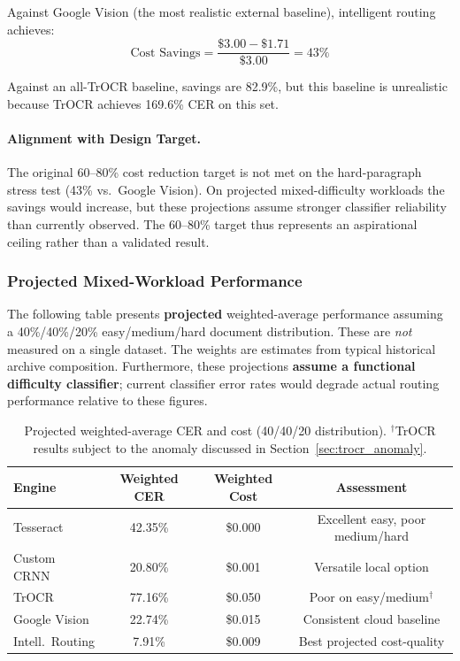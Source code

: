 \documentclass[12pt,a4paper]{article}
\begin{document}
Against Google Vision (the most realistic external baseline),
intelligent routing achieves:
\[
  \text{Cost Savings} =
  \frac{\$3.00 - \$1.71}{\$3.00} = 43\%
\]

Against an all-TrOCR baseline, savings are 82.9\%, but this baseline
is unrealistic because TrOCR achieves 169.6\% CER on this set.

\paragraph{Alignment with Design Target.}
The original 60--80\% cost reduction target is not met on the
hard-paragraph stress test (43\% vs.\ Google Vision). On projected
mixed-difficulty workloads the savings would increase, but these
projections assume stronger classifier reliability than currently
observed. The 60--80\% target thus represents an
aspirational ceiling rather than a validated result.

\subsubsection{Projected Mixed-Workload Performance}

\begin{tcolorbox}[colback=orange!5!white, colframe=orange!50!black,
    title=Projection Warning]
  The following table presents \textbf{projected} weighted-average
  performance assuming a 40\%/40\%/20\% easy/medium/hard document
  distribution. These are \emph{not} measured on a single dataset.
  The weights are estimates from typical historical archive
  composition. Furthermore, these projections \textbf{assume a
    functional difficulty classifier}; current classifier error rates
  would degrade actual routing performance
  relative to these figures.
\end{tcolorbox}

\begin{table}[H]
  \centering
  \small
  \begin{tabular}{lccc}
    \toprule
    \textbf{Engine} & \textbf{Weighted CER}
    & \textbf{Weighted Cost} & \textbf{Assessment} \\
    \midrule
    Tesseract   & 42.35\% & \$0.000
    & Excellent easy, poor medium/hard \\
    Custom CRNN & 20.80\% & \$0.001
    & Versatile local option \\
    TrOCR       & 77.16\% & \$0.050
    & Poor on easy/medium$^\dagger$ \\
    Google Vision & 22.74\% & \$0.015
    & Consistent cloud baseline \\
    Intell.\ Routing & 7.91\% & \$0.009
    & Best projected cost-quality \\
    \bottomrule
  \end{tabular}
  \caption{Projected weighted-average CER and cost (40/40/20
    distribution). $^\dagger$TrOCR results subject to the anomaly
    discussed in Section~\ref{sec:trocr_anomaly}.}
  \label{tab:projected}
\end{table}
\end{document}
